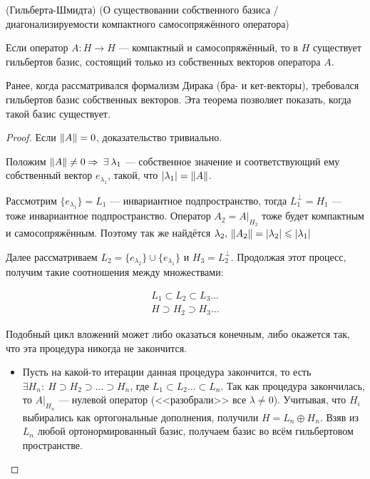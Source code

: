 \documentclass[12pt]{article}
\begin{document}
		\begin{theorem}
			(Гильберта-Шмидта) (О существовании {\color{gray}собственного} базиса
			/диагонализируемости компактного самосопряжённого оператора)
		
			Если оператор $A : H \rightarrow H$ --- компактный и самосопряжённый, то в $H$ существует гильбертов 
			базис, состоящий только из собственных векторов оператора $A$.
		\end{theorem}
		Ранее, когда рассматривался формализм Дирака (бра- и кет-векторы), требовался гильбертов базис собственных
		векторов. Эта теорема позволяет показать, когда такой базис существует.
		\begin{proof}
			Если $\left\| A \right\| = 0$, доказательство тривиально.
		
			Положим $\norm{A} \neq 0 \Rightarrow \exists \lambda_1$ --- собственное значение и соответствующий ему 
			собственный вектор $e_{\lambda_1}$, такой, что $\left| \lambda_1 \right| = \left\| A \right\|$.
		
			Рассмотрим $\{e_{\lambda_1}\} = L_1$ --- инвариантное подпространство, тогда $L_1^{\perp} = H_1$ --- тоже инвариантное 
			подпространство. Оператор $A_2 = A|_{H_2}$ тоже будет компактным и самосопряжённым. Поэтому так же найдётся
			$\lambda_2,\, \left\| A_2 \right\| = \left| \lambda_2 \right| \leqslant \left| \lambda_1 \right|$
		
			Далее рассматриваем $L_2 = \{e_{\lambda_2}\} \cup \{e_{\lambda_1}\}$ и $H_3 = L_2^{\perp}$. Продолжая этот 
			процесс, получим такие соотношения между множествами:
		
			\begin{gather*}
				L_1 \subset L_2 \subset L_3 \dots \\
				H \supset H_2 \supset H_3 \dots
			\end{gather*}
		
			Подобный цикл вложений может либо оказаться конечным, либо окажется так, что эта процедура никогда не закончится.

			\begin{itemize}
			\item Пусть на какой-то итерации данная процедура закончится, то есть $\exists H_n:\: H \supset H_2 \supset \dots \supset H_n$,
				где $L_1 \subset L_2 \dots \subset L_n$. Так как процедура закончилась, то $A|_{H_n}$ --- нулевой оператор (<<разобрали>>
				все $\lambda \neq 0$). Учитывая, что $H_i$ выбирались как ортогональные дополнения, получили $H = L_n \oplus H_n$. 
				Взяв из $L_n$ любой ортонормированный базис, получаем базис во всём гильбертовом пространстве.
		

\end{itemize}
\end{proof}
\end{document}
